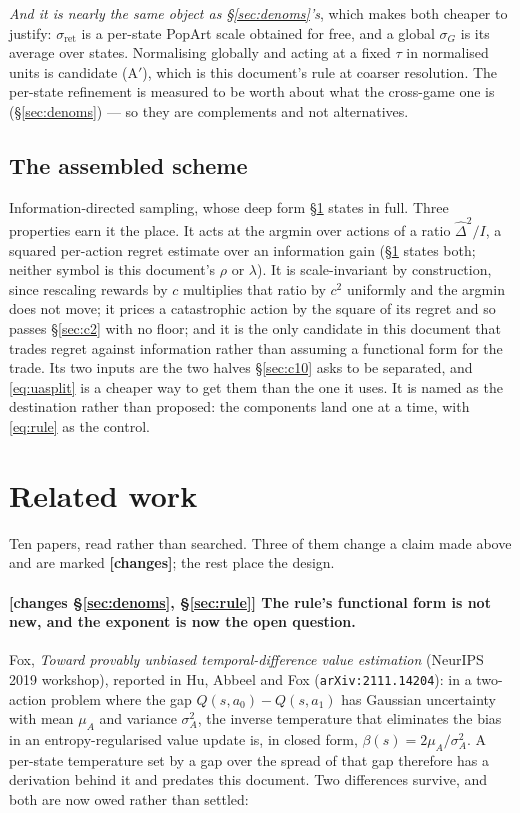 \documentclass{article}
\newcommand{\sret}{\sigma_{\mathrm{ret}}}
\newcommand{\snorm}{\sigma_{G}}
\begin{document}
\emph{And it is nearly the same object as \S\ref{sec:denoms}'s}, which makes both cheaper to
justify: $\sret$ is a per-state PopArt scale obtained for free, and a global $\snorm$ is its
average over states. Normalising globally and acting at a fixed $\tau$ in normalised units is
candidate (A$'$), which is this document's rule at coarser resolution. The per-state refinement
is measured to be worth about what the cross-game one is (\S\ref{sec:denoms}) --- so they are
complements and not
alternatives.

\subsection{The assembled scheme}

Information-directed sampling, whose deep form \S\ref{sec:related} states in full. Three
properties earn it the place. It acts at the argmin over actions of a ratio $\hat\Delta^2/I$,
a squared per-action regret estimate over an information gain (\S\ref{sec:related} states both;
neither symbol is this document's $\rho$ or $\lambda$). It is scale-invariant by construction,
since rescaling rewards by $c$ multiplies that ratio by $c^2$ uniformly and the argmin does not
move; it prices a catastrophic action by the square of its regret and so passes \S\ref{sec:c2}
with no floor; and it is the only
candidate in this document that trades regret against information rather than assuming a
functional form for the trade. Its two inputs are the two halves \S\ref{sec:c10} asks to be
separated, and \eqref{eq:uasplit} is a cheaper way to get them than the one it uses. It is named
as the destination rather than proposed: the components land one at a time, with \eqref{eq:rule}
as the control.

\section{Related work}
\label{sec:related}

Ten papers, read rather than searched. Three of them change a claim made above and are marked
\textbf{[changes]}; the rest place the design.

\paragraph{\textbf{[changes \S\ref{sec:denoms}, \S\ref{sec:rule}]} The rule's functional form is
not new, and the exponent is now the open question.} Fox, \emph{Toward provably unbiased
temporal-difference value estimation} (NeurIPS 2019 workshop), reported in Hu, Abbeel and Fox
(\texttt{arXiv:2111.14204}): in a two-action problem where the gap $Q(s,a_0) - Q(s,a_1)$ has
Gaussian uncertainty with mean $\mu_A$ and variance $\sigma_A^2$, the inverse temperature that
eliminates the bias in an entropy-regularised value update is, in closed form,
$\beta(s) = 2\mu_A/\sigma_A^2$. A per-state temperature set by a gap over the spread of that gap
therefore has a derivation behind it and predates this document. Two differences survive, and
both are now owed rather than settled:
\end{document}
